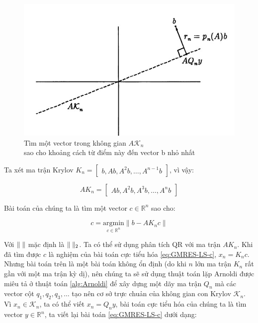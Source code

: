 \documentclass[14pt, a4paper]{article}
\numberwithin{equation}{section}
\numberwithin{algorithm}{section}
\numberwithin{figure}{section}
\numberwithin{dl}{section}
\numberwithin{md}{section}
\numberwithin{bd}{section}
\begin{document}
\begin{figure}[h!] \centering

    \includegraphics[scale=0.8]{figures/GMRES-LS.jpg}
    \caption{Tìm một vector trong không gian $A \mathcal{K}_n$ \\ sao cho khoảng cách từ điểm này đến vector b nhỏ nhất}

    \label{fig:GMRES-LS}
\end{figure}

Ta xét ma trận Krylov $K_n = \begin{bmatrix} b, Ab, A^2b, \dots, A^{n-1}b \end{bmatrix}$, vì vậy:

\begin{equation}
    A K_n = \begin{bmatrix} Ab, A^2b, A^3b, \dots, A^nb \end{bmatrix}
\end{equation}

Bài toán của chúng ta là tìm một vector $c \in \mathbb{R}^n$ sao cho:

\begin{equation} \label{eq:GMRES-LS-c}
    c = \underset{c \in \mathbb{R}^{n}}{\mathrm{argmin}} \lVert b - AK_n c \rVert
\end{equation}

Với $\lVert \thickspace \rVert$ mặc định là $\lVert \thickspace \rVert_2$. Ta có thể sử dụng phân tích QR với ma trận $AK_n$. Khi đã tìm được $c$ là nghiệm của bài toán cực tiểu hóa \ref{eq:GMRES-LS-c}, $x_n=K_n c$. Nhưng bài toán trên là một bài toán không ổn định (do khi $n$ lớn ma trận $K_n$ rất gần với một ma trận kỳ dị), nên chúng ta sẽ sử dụng thuật toán lặp Arnoldi được miêu tả ở thuật toán \ref{alg:Arnoldi}
để xây dựng một dãy ma trận $Q_n$ mà các vector cột $q_1, q_2, q_3, \dots$ tạo nên cơ sở trực chuản của không gian con Krylov $\mathcal{K}_n$. Vì $x_n \in \mathcal{K}_n$, ta có thể viết $x_n = Q_n y$, bài toán cực tiểu hóa của chúng ta là tìm vector $y \in \mathbb{R}^n$, ta viết lại bài toán \ref{eq:GMRES-LS-c} dưới dạng:
\end{document}
